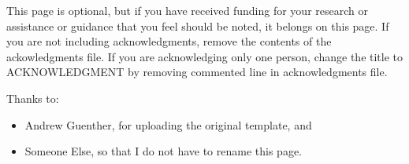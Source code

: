 
\begin{acknowledgments}

    This page is optional, but if you have received funding for your research or assistance or guidance that you feel should be noted, it belongs on this page. If you are not including acknowledgments, remove the contents of the ackowledgments file. If you are acknowledging only one person, change the title to ACKNOWLEDGMENT by removing commented line in acknowledgments file.

    Thanks to:
    \begin{itemize}
        \item Andrew Guenther, for uploading the original template, and
        \item Someone Else, so that I do not have to rename this page.
    \end{itemize}
\end{acknowledgments}
